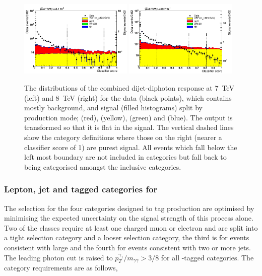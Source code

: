 \begin{figure}
  \includegraphics[width=0.48\textwidth]{selec_and_cats/plots/mixedcombbdt_transformed_7TeV_fix_fix.pdf}
  \includegraphics[width=0.48\textwidth]{selec_and_cats/plots/mixedcombbdt_transformed_8TeV_fix_fix.pdf}
  \caption[The distribution of the combined dijet-diphoton \acs{BDT} response]{The distributions of the combined dijet-diphoton \BDT response at 7~TeV (left) and 8~TeV (right) for the data (black points), which contains mostly background, and signal (filled histograms) split by production mode; \ggH (red), \VBF (yellow), \VH (green) and \ttH (blue). The output is transformed so that it is flat in the \VBF signal. The vertical dashed lines show the \VBF category definitions where those on the right (nearer a classifier score of 1) are purest \VBF signal. All events which fall below the left most boundary are not included in \VBF categories but fall back to being categorised amongst the inclusive categories.}
  \label{fig:vbf_dijet_comb}
\end{figure}

\subsubsection{Lepton, jet and \MET tagged categories for \VH}
\label{sec:vh_tag}

The selection for the four categories designed to tag \VH production are optimised by minimising the expected uncertainty on the signal strength of this process alone. Two of the classes require at least one charged muon or electron and are split into a tight selection category and a looser selection category, the third is for events consistent with large \MET and the fourth for events consistent with two or more jets. The leading photon cut is raised to $p_{T}^{\gamma_{1}}/m_{\gamma\gamma}>3/8$ for all \VH-tagged categories. The category requirements are as follows,

